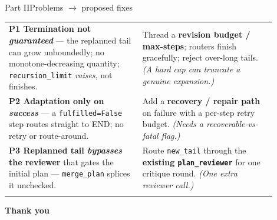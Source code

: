 \documentclass[aspectratio=169,11pt]{beamer}
\newcommand{\code}[1]{\texttt{\small #1}}
\newcommand{\good}[1]{\textcolor{camgreen}{#1}}
\newcommand{\bad}[1]{\textcolor{camred}{#1}}
\begin{document}
\begin{frame}{Part II\quad Problems $\rightarrow$ proposed fixes}
\vfill
\begin{center}
{\small
\renewcommand{\arraystretch}{1.4}
\begin{tabular}{@{}>{\raggedright\arraybackslash}p{0.45\linewidth}@{\ \ $\rightarrow$\ \ }>{\raggedright\arraybackslash}p{0.45\linewidth}@{}}
\toprule
\multicolumn{1}{@{}c}{\textbf{\bad{Problem}}} & \multicolumn{1}{c@{}}{\textbf{\good{Fix}}}\\
\midrule
\addlinespace[1ex]
\textbf{P1 Termination not \emph{guaranteed}} --- the replanned tail can grow unboundedly; no monotone-decreasing quantity; \code{recursion\_limit} \emph{raises}, not finishes.
& Thread a \textbf{revision budget / max-steps}; routers finish gracefully; reject over-long tails. \emph{(A hard cap can truncate a genuine expansion.)}\\
\addlinespace[2.5ex]
\textbf{P2 Adaptation only on \emph{success}} --- a \code{fulfilled=False} step routes straight to END; no retry or route-around.
& Add a \textbf{recovery / repair path} on failure with a per-step retry budget. \emph{(Needs a recoverable-vs-fatal flag.)}\\
\addlinespace[2.5ex]
\textbf{P3 Replanned tail \emph{bypasses} the reviewer} that gates the initial plan --- \code{merge\_plan} splices it unchecked.
& Route \code{new\_tail} through the \textbf{existing \code{plan\_reviewer}} for one critique round. \emph{(One extra reviewer call.)}\\
\addlinespace[1ex]
\bottomrule
\end{tabular}}
\end{center}
\vfill
\end{frame}

\begin{frame}[plain]
\centering
\vfill
{\Huge\bfseries Thank you}
\vfill
\end{frame}
\end{document}
